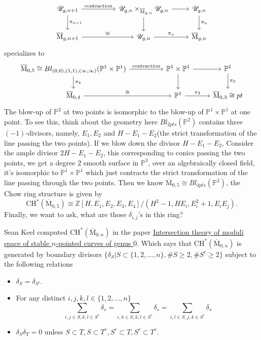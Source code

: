 \documentclass[../main.tex]{subfiles}
\begin{document}
\begin{example}
$$\begin{tikzcd}
\mathscr{U}_{g,n+1}\arrow{rr}{\text{contraction}}\arrow{d}{\pi_{n+1}}& & \mathscr{U}_{g,n}\times_{\overline{\mathrm{M}}_{g,n}}\mathscr{U}_{g,n}\arrow{r}\arrow{d} & \mathscr{U}_{g,n}\arrow{d}{\pi_{n}}\\
\overline{\mathrm{M}}_{g,n+1}\arrow{rr}{\cong}& &\mathscr{U}_{g,n}\arrow{r}{\pi_{n}} & \overline{\mathrm{M}}_{g,n}
\end{tikzcd}$$
specializes to 
$$
\begin{tikzcd}
\overline{\mathrm{M}}_{0,5}\cong Bl_{(0,0),(1,1),(\infty, \infty)}(\mathbb{P}^{1}\times \mathbb{P}^{1})\arrow{rr}{\text{contraction}}\arrow{d}{\pi_{4}}& & \mathbb{P}^{1}\times \mathbb{P}^{1}\arrow{r}\arrow{d} & \mathbb{P}^{1}\arrow{d}{\pi_{3}}\\
\overline{\mathrm{M}}_{0,4}\arrow{rr}{\cong}& &\mathbb{P}^{1}\arrow{r}{\pi_{3}} & \overline{\mathrm{M}}_{0,3}\cong pt
\end{tikzcd}$$
The blow-up of $\mathbb{P}^{2}$ at two points is isomorphic to the blow-up of $\mathbb{P}^{1}\times \mathbb{P}^{1}$ at one point. To see this,  think about the geometry here $Bl_{2pts}(\mathbb{P}^{2})$ contains three $(-1)$-divisors, namely, $E_{1}, E_{2}$ and $H-E_{1}-E_{2}$(the strict transformation of the line passing the two points). If we blow down the divisor $H-E_{1}-E_{2}$, Consider the ample divisor $2H-E_{1}-E_{2}$, this corresponding to conics passing the two points, we get a degree $2$ smooth surface in $\mathbb{P}^{3}$, 
over an algebraically closed field, it's isomorphic to $\mathbb{P}^{1}\times \mathbb{P}^{1}$ which just contracts the strict transformation of the line passing through the two points. Then we know $\overline{\mathrm{M}}_{0,5}\cong Bl_{4pts}(\mathbb{P}^{2})$, the Chow ring structure is given by 
$$\mathrm{CH}^{*}(\overline{\mathrm{M}}_{0,5})\cong \mathbb{Z}[H, E_{1},E_{2}, E_{3}, E_{4}]/(H^{2}-1, HE_{i}, E_{i}^{2}+1, E_{i}E_{j}).$$
Finally, we want to ask, what are those $\delta_{i,j}$'s in this ring?
\end{example}
\begin{remark}
Sean Keel computed $\mathrm{CH}^{*}(\overline{\mathrm{M}}_{0,n})$ in the paper \href{http://www.math.colostate.edu/~renzo/teaching/Topics10/keel.pdf}{Intersection theory of moduli space of stable $n$-pointed curves of genus $0$}. Which says that $\mathrm{CH}^{*}(\overline{\mathrm{M}}_{0,n})$ is generated by boundary divisors $\{\delta_{S}|S\subset \{1,2,\dots, n\}, \#S \geq2, \# S^{c}\geq2\}$ subject to the following relations
\begin{itemize}
\item $\delta_{S}=\delta_{S^{c}}$.
\item For any distinct $i,j,k,l\in \{1,2,\dots, n\}$ 
$$\sum_{i,j\in S, k,l\in S^{c}}\delta_{s}=\sum_{i,k\in S, k,l\in S^{c}}\delta_{s}=\sum_{i,l\in S, j,k\in S^{c}}\delta_{s}$$
\item $\delta_{S}\delta_{T}=0$ unless $S\subset T, S\subset T^{c}, S^{c}\subset T, S^{c}\subset T^{c}$.
\end{itemize}
\end{remark}
\end{document}
